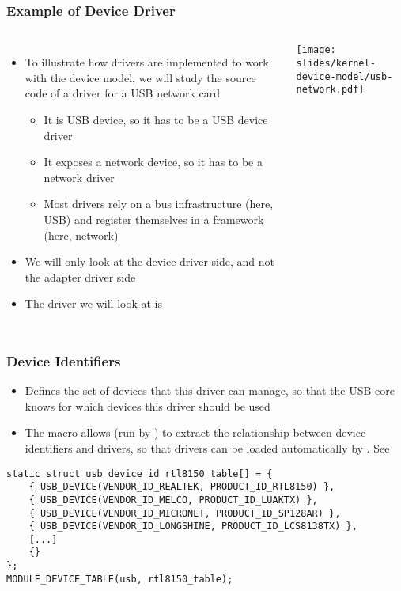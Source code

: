 \begin{frame}
  \frametitle{Example of Device Driver}
  \begin{columns}
  \begin{itemize}
  \item To illustrate how drivers are implemented to work with the
    device model, we will study the source code of a driver for a USB
    network card
    \begin{itemize}
    \item It is USB device, so it has to be a USB device driver
    \item It exposes a network device, so it has to be a network driver
    \item Most drivers rely on a bus infrastructure (here, USB) and
      register themselves in a framework (here, network)
    \end{itemize}
  \item We will only look at the device driver side, and not the
    adapter driver side
  \item The driver we will look at is 
  \end{itemize}
      \texttt{[image: slides/kernel-device-model/usb-network.pdf]}
  \end{columns}
\end{frame}

\begin{frame}[fragile]
  \frametitle{Device Identifiers}
  \begin{itemize}
  \item Defines the set of devices that this driver can manage, so
    that the USB core knows for which devices this driver should be
    used
  \item The  macro allows 
    (run by ) to extract the relationship
    between device identifiers and drivers, so that drivers can be
    loaded automatically by .
    See 
  \end{itemize}
  \begin{block}{}
  \begin{verbatim}
static struct usb_device_id rtl8150_table[] = {
    { USB_DEVICE(VENDOR_ID_REALTEK, PRODUCT_ID_RTL8150) },
    { USB_DEVICE(VENDOR_ID_MELCO, PRODUCT_ID_LUAKTX) },
    { USB_DEVICE(VENDOR_ID_MICRONET, PRODUCT_ID_SP128AR) },
    { USB_DEVICE(VENDOR_ID_LONGSHINE, PRODUCT_ID_LCS8138TX) },
    [...]
    {}
};
MODULE_DEVICE_TABLE(usb, rtl8150_table);
  \end{verbatim}
  \end{block}
\end{frame}

